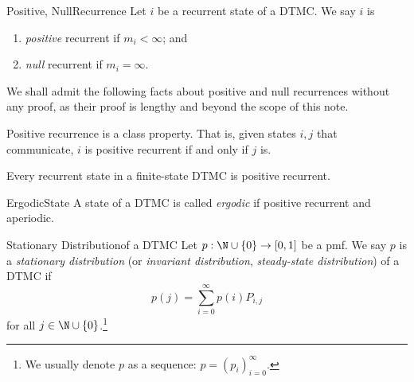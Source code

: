 \documentclass[stat333]{subfiles}
\begin{document}
    \begin{definition}{Positive, Null}{Recurrence}
        Let $i$ be a recurrent state of a DTMC. We say $i$ is
        \begin{enumerate}
            \item \emph{positive} recurrent if $m_i<\infty$; and
            \item \emph{null} recurrent if $m_i=\infty$.
        \end{enumerate}
    \end{definition}

    \noindent We shall admit the following facts about positive and null recurrences without any proof, as their proof is lengthy and beyond the scope of this note.

    \clearpage
    \begin{fact}{}
        Positive recurrence is a class property. That is, given states $i,j$ that communicate, $i$ is positive recurrent if and only if $j$ is.
    \end{fact}

    \begin{fact}{}
        Every recurrent state in a finite-state DTMC is positive recurrent.
    \end{fact}

    \begin{definition}{Ergodic}{State}
        A state of a DTMC is called \emph{ergodic} if positive recurrent and aperiodic.
    \end{definition}

    \begin{definition}{Stationary Distribution}{of a DTMC}
        Let $p:\N\cup\left\lbrace 0 \right\rbrace\to\left[ 0,1 \right]$ be a pmf. We say $p$ is a \emph{stationary distribution} (or \emph{invariant distribution}, \emph{steady-state distribution}) of a DTMC if
        \begin{equation*}
            p\left( j \right) = \sum^{\infty}_{i=0} p\left( i \right)P_{i,j}
        \end{equation*}
        for all $j\in\N\cup\left\lbrace 0 \right\rbrace$.\footnote{We usually denote $p$ as a sequence: $p=\left( p_{i} \right)^{\infty}_{i=0}$.}
    \end{definition}
\end{document}
